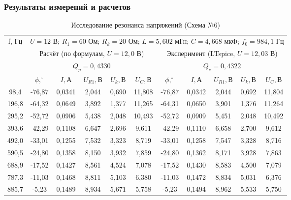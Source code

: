 \documentclass[a4paper,12pt]{article}
\begin{document}
\subsubsection{Результаты измерений и расчетов}

\begin{table}[H]
\centering
\caption{Исследование резонанса напряжений (Схема №6)}
\label{tab:table23_final}
\scriptsize
\renewcommand{\arraystretch}{1.3}
\begin{tabular}{|c|c|c|c|c|c|c|c|c|c|c|}
\hline
\multirow{4}{*}{f, Гц} & \multicolumn{10}{c|}{$U = 12$ В; $R_1 = 60$ Ом; $R_k = 20$ Ом; $L = 5,602$ мГн; $C = 4,668$ мкФ; $f_0 = 984,1$ Гц} \\ \cline{2-11} 
 & \multicolumn{5}{c|}{Расчёт (по формулам, $U=12,0$ В)} & \multicolumn{5}{c|}{Эксперимент (LTspice, $U=12,03$ В)} \\ \cline{2-11} 
 & \multicolumn{5}{c|}{$Q_p = 0,4330$} & \multicolumn{5}{c|}{$Q_e = 0,4322$} \\ \cline{2-11} 
 & \multicolumn{1}{c|}{$\phi, ^\circ$} & \multicolumn{1}{c|}{$I, А$} & \multicolumn{1}{c|}{$U_{R1}, В$} & \multicolumn{1}{c|}{$U_k, В$} & $U_C, В$ & \multicolumn{1}{c|}{$\phi, ^\circ$} & \multicolumn{1}{c|}{$I, А$} & \multicolumn{1}{c|}{$U_{R1}, В$} & \multicolumn{1}{c|}{$U_k, В$} & $U_C, В$ \\ \hline
98,4   & -76,87 & 0,0341 & 2,044 & 0,690 & 11,808 & -76,87 & 0,0342 & 2,044 & 0,692 & 11,804 \\ \hline
196,8  & -64,32 & 0,0649 & 3,892 & 1,377 & 11,265 & -64,31 & 0,0650 & 3,901 & 1,376 & 11,264 \\ \hline
295,2  & -52,72 & 0,0906 & 5,438 & 2,048 & 10,493 & -52,72 & 0,0909 & 5,451 & 2,048 & 10,492 \\ \hline
393,6  & -42,29 & 0,1108 & 6,647 & 2,696 & 9,611  & -42,29 & 0,1110 & 6,658 & 2,700 & 9,612  \\ \hline
492,0  & -33,01 & 0,1255 & 7,532 & 3,323 & 8,719  & -33,01 & 0,1258 & 7,547 & 3,328 & 8,716  \\ \hline
590,5  & -24,80 & 0,1358 & 8,150 & 3,932 & 7,859  & -24,80 & 0,1362 & 8,171 & 3,928 & 7,863  \\ \hline
688,9  & -17,52 & 0,1427 & 8,561 & 4,524 & 7,078  & -17,52 & 0,1430 & 8,583 & 4,500 & 7,079  \\ \hline
787,3  & -11,03 & 0,1468 & 8,811 & 5,103 & 6,380  & -11,03 & 0,1472 & 8,834 & 5,031 & 6,376  \\ \hline
885,7  & -5,23  & 0,1489 & 8,934 & 5,671 & 5,758  & -5,23  & 0,1494 & 8,962 & 5,533 & 5,750  \\ \hline

\end{tabular}
\end{table}
\end{document}

